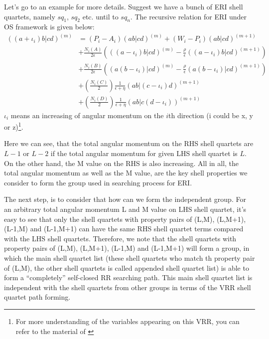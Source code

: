 Let's go to an example for more details. Suggest we have a bunch of 
ERI shell quartets, namely $sq_{1}$, $sq_{2}$ etc. until to $sq_{n}$.
The recursive relation for ERI under OS framework is given below:
\begin{equation}
 \begin{split}
((a+\iota_{i})b|cd)^{(m)} &= (P_{i} - A_{i})(ab|cd)^{(m)} +
\left(W_{i} -P_{i}\right)(ab|cd)^{(m+1)} \\
&+\frac{N_{i}(A)}{2\epsilon}\left(((a-\iota_{i})b|cd)^{(m)}-\frac{\rho}{
\epsilon }((a-\iota_{i})b|cd)^{(m+1)}\right)  \\
&+\frac{N_{i}(B)}{2\epsilon}\left((a(b-\iota_{i})|cd)^{(m)}-\frac{\rho}{
\epsilon }(a(b-\iota_{i})|cd)^{(m+1)}\right)  \\
&+\left(\frac{N_{i}(C)}{2}\right)\frac{1}{\epsilon+\eta}
(ab|(c-\iota_{i})d)^{(m+1)} \\
&+\left(\frac{N_{i}(D)}{2}\right)\frac{1}{\epsilon+\eta}
(ab|c(d-\iota_{i}))^{(m+1)}
\end{split}
\label{OS_ERI_result}
\end{equation}
$\iota_{i}$ means an increasing of angular momentum on the $i$th direction (i
could be x, y or z)\footnote{For more understanding of the variables 
appearing on this VRR, you can refer to the material of \cite{OS1986}}. 

Here we can see, that the total angular momentum on the RHS shell quartets are 
$L-1$ or $L-2$ if the total angular momentum for given LHS shell quartet is $L$.
On the other hand, the M value on the RHS is also increasing. All in all, the 
total angular momentum as well as the M value, are the key shell properties
we consider to form the group used in searching process for ERI.

The next step, is to consider that how can we form the independent group.
For an arbitrary total angular momentum L and M value on LHS shell quartet, 
it's easy to see that only the shell quartets with property pairs of (L,M), 
(L,M+1), (L-1,M) and (L-1,M+1) can have the same RHS shell quartet terms compared 
with the LHS shell quartets. Therefore, we note that the shell quartets with 
property pairs of (L,M), (L,M+1), (L-1,M) and (L-1,M+1) will form a 
group, in which the main shell quartet list (these shell quartets who
match th property pair of (L,M), the other shell quartets is called 
appended shell quartet list) is able to form a ``completely'' self-closed 
RR searching path. This main shell quartet list is independent with the 
shell quartets from other groups in terms of the VRR shell quartet path forming.

